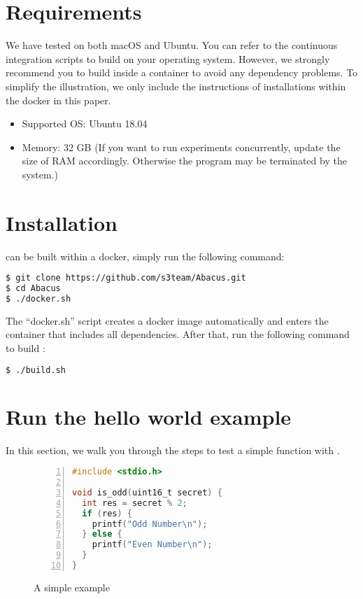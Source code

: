 \section*{Requirements}
We have tested \tool{} on both macOS and Ubuntu. You can refer to the continuous integration scripts to build \tool{} on your operating system. However, we strongly recommend you to build \tool{} inside a container to avoid any dependency problems. To simplify the illustration, we only include the instructions of installations within the docker in this paper.
\begin{itemize}
\item Supported OS: Ubuntu 18.04
\item Memory: 32 GB (If you want to run experiments concurrently, update the size of RAM
     accordingly. Otherwise the program may be terminated by the system.)
\end{itemize}

\section*{Installation}

\tool{} can be built within a docker, simply run the following command:

\begin{lstlisting}[language=bash, frame=none, numbers=none]
$ git clone https://github.com/s3team/Abacus.git
$ cd Abacus
$ ./docker.sh
\end{lstlisting}

The ``docker.sh'' script creates a docker image automatically and enters the container that includes all dependencies. After that, run the following command to build \tool{}:

\begin{lstlisting}[language=bash]
$ ./build.sh
\end{lstlisting}
\section*{Run the hello world example}
In this section, we walk you through the steps to test a simple function with \tool{}.

\begin{figure}[h]
\begin{lstlisting}[xleftmargin=.07\textwidth, xrightmargin=.07\textwidth,numbers=left, frame=single, language=C]
#include <stdio.h>

void is_odd(uint16_t secret) {
  int res = secret % 2;        
  if (res) {             
    printf("Odd Number\n");
  } else {
    printf("Even Number\n");
  }
}
\end{lstlisting}
\caption{A simple example}
\label{fig:example0}
\end{figure}

